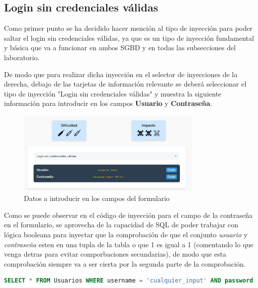 \documentclass[a4paper,12pt]{article}
\begin{document}

\subsection{Login sin credenciales válidas}
Como primer punto se ha decidido hacer mención al tipo de inyección para poder saltar el login sin credenciales válidas, ya que es un tipo de inyección fundamental y básica que va a funcionar en ambos SGBD
y en todas las subsecciones del laboratorio.

De modo que para realizar dicha inyección en el selector de inyecciones de la derecha, debajo de las tarjetas de información relevante se deberá seleccionar el tipo de inyección "Login sin credenciales válidas"
y muestra la siguiente información para introducir en los campos \textbf{Usuario} y \textbf{Contraseña}.

\begin{figure}[H]
    \centering
    \includegraphics[width=0.8\textwidth]{Imagenes/error3.png}
    \caption{Datos a introducir en los campos del formulario}
\end{figure}

Como se puede observar en el código de inyección para el campo de la contraseña en el formulario, se aprovecha de la capacidad de SQL de poder trabajar con lógica booleana para inyectar
que la comprobación de que el conjunto \textit{usuario} y \textit{contraseña} esten en una tupla de la tabla o que 1 es igual a 1 (comentando lo que venga detras para evitar comporbaciones secundarias),
de modo que esta comprobación siempre va a ser cierta por la segunda parte de la comprobación.

\begin{lstlisting}[language=SQL]
SELECT * FROM Usuarios WHERE username = 'cualquier_input' AND password = 'cualquier_input' OR 1=1 --'
\end{lstlisting}
\end{document}
